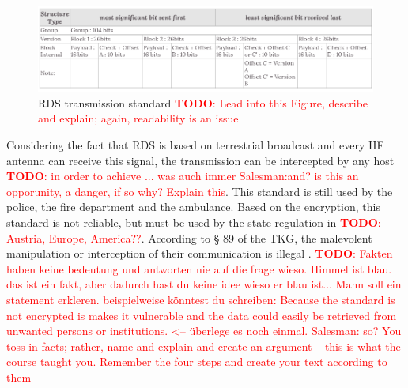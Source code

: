 \documentclass[conference,12pt,a4paper]{IEEEtran}
\newcommand{\todo}[1]{\textcolor{red}{\textbf{TODO}: #1}}
\begin{document}
	\begin{figure}[h]
		\centering
		\includegraphics[scale=0.265]{img/standard}
		\caption{RDS transmission standard \todo{Lead into this Figure, describe and explain; again, readability is an issue}}
		\label{fig: standard}
	\end{figure}
	
	Considering the fact that RDS is based on terrestrial broadcast and every HF antenna can receive this signal, the transmission can be intercepted by any host \todo{in order to achieve ... was auch immer Salesman:and? is this an opporunity, a danger, if so why? Explain this}. This standard is still used by the police, the fire department and the ambulance.  Based on the encryption, this standard is not reliable, but must be used by the state regulation in \todo{Austria, Europe, America??}. According to § 89 of the TKG, the malevolent manipulation or interception of their communication is illegal \cite{telecomGesetz}. \todo{Fakten haben keine bedeutung und antworten nie auf die frage wieso. Himmel ist blau. das ist ein fakt, aber dadurch hast du keine idee wieso er blau ist... Mann soll ein statement erkleren. beispielweise könntest du schreiben: Because the standard is not encrypted is makes it vulnerable and the data could easily be retrieved from unwanted persons or institutions. <-- überlege es noch einmal. Salesman: so? You toss in facts; rather, name and explain and create an argument – this is what the course taught you. Remember the four steps and create your text according to them}\\
	
	
\end{document}

